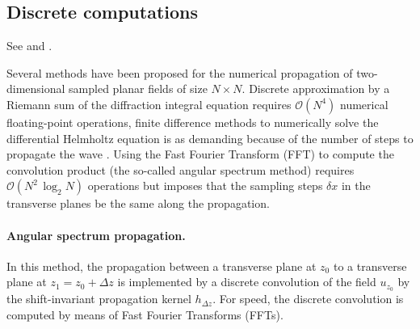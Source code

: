 \documentclass[a4paper]{article}
\begin{document}
\subsection{Discrete computations}

See \citet{Sziklas-1974-diffraction_calculations} and \citet{Sziklas-1975-FFT_method}.

Several methods have been proposed for the numerical propagation of
two-dimensional sampled planar fields of size $N×N$. Discrete approximation by
a Riemann sum of the diffraction integral equation requires
$\mathcal{O}(N^{4})$ numerical floating-point operations, finite difference
methods to numerically solve the differential Helmholtz equation is as
demanding because of the number of steps to propagate the wave
\citep{Sziklas-1975-FFT_method}. Using the Fast Fourier Transform (FFT) to
compute the convolution product (the so-called angular spectrum method)
requires $\mathcal{O}(N^{2}\,\log_{2}N)$ operations but imposes that the
sampling steps $δx$ in the transverse planes be the same along the propagation.

\paragraph{Angular spectrum propagation.}
In this method, the propagation between a transverse plane at $z_{0}$ to a
transverse plane at $z_{1} = z_{0} + Δz$ is implemented by a discrete
convolution of the field $u_{z_{0}}$ by the shift-invariant propagation kernel
$h_{Δz}$. For speed, the discrete convolution is computed by means of Fast
Fourier Transforms (FFTs).
\end{document}
